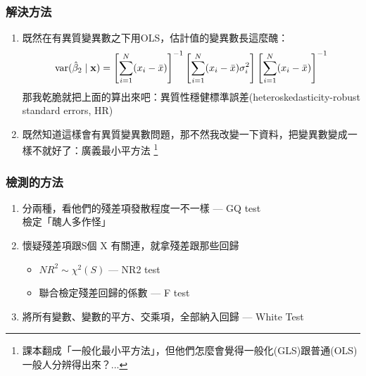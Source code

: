 \begin{frame}
    \frametitle{解決方法}
    \begin{enumerate}
        \item 既然在有異質變異數之下用OLS，估計值的變異數長這麼醜：
        \begin{equation*}
            \operatorname{var}(\hat{\beta}_2 \mid \mathbf{x})=
            \left[
                \sum_{i=1}^N(x_i - \bar{x})
            \right]^{-1}
            \left[
                \sum_{i=1}^N(x_i - \bar{x})\sigma_i^2
            \right]
            \left[
                \sum_{i=1}^N(x_i - \bar{x})
            \right]^{-1}
        \end{equation*}
        那我乾脆就把上面的算出來吧：異質性穩健標準誤差(heteroskedasticity-robust standard errors, HR) 
        \vfill
        \item 既然知道這樣會有異質變異數問題，那不然我改變一下資料，把變異數變成一樣不就好了：廣義最小平方法
        \footnote{課本翻成「一般化最小平方法」，但他們怎麼會覺得一般化(GLS)跟普通(OLS)一般人分辨得出來？...}
    \end{enumerate}
\end{frame}

\begin{frame}
    \frametitle{檢測的方法}

    \begin{enumerate}
        \item 分兩種，看他們的殘差項發散程度一不一樣 --- GQ test
            \\ 檢定「醜人多作怪」
        \item 懷疑殘差項跟S個 X 有關連，就拿殘差跟那些回歸
            \begin{itemize}
                \item $NR^2 \sim \chi^2(S)$ --- NR2 test 
                \item 聯合檢定殘差回歸的係數 --- F test 
            \end{itemize}
        \item 將所有變數、變數的平方、交乘項，全部納入回歸 --- White Test
    \end{enumerate}

\end{frame}
